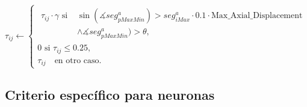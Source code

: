 
\begin{equation}
    \tau_{ij} \leftarrow
        \begin{cases}
        \begin{split}
         \tau_{ij} \cdot \gamma \text{ si } & \sin(\measuredangle seg^{a}_{pMaxMin}) > seg^{a}_{iMax} \cdot 0.1 \cdot \text{Max\_Axial\_Displacement} \\ & \land \measuredangle seg^{a}_{pMaxMin}) > \theta,
        \end{split}
        \\[3ex]
        
        \text{0 si } \tau_{ij} \leq 0.25, \\[3ex]
        \tau_{ij} \quad \text{en otro caso}.
        \end{cases}
    \label{eq:antiPheroSAP_Axial}
\end{equation}






\subsection{Criterio espec\'ifico para neuronas}
\label{subsec:pheroNeurons}


